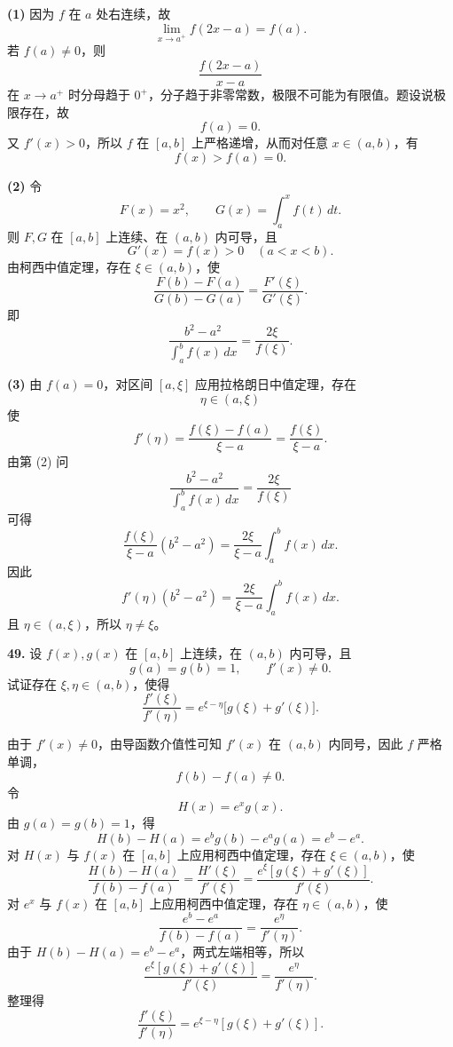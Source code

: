 \begin{solutionblock}
\textbf{(1)} 因为 \(f\) 在 \(a\) 处右连续，故
\[
\lim_{x\to a^+}f(2x-a)=f(a).
\]
若 \(f(a)\ne0\)，则
\[
\frac{f(2x-a)}{x-a}
\]
在 \(x\to a^+\) 时分母趋于 \(0^+\)，分子趋于非零常数，极限不可能为有限值。题设说极限存在，故
\[
f(a)=0.
\]
又 \(f'(x)>0\)，所以 \(f\) 在 \([a,b]\) 上严格递增，从而对任意 \(x\in(a,b)\)，有
\[
f(x)>f(a)=0.
\]

\textbf{(2)} 令
\[
F(x)=x^2,\qquad G(x)=\int_a^x f(t)\,dt.
\]
则 \(F,G\) 在 \([a,b]\) 上连续、在 \((a,b)\) 内可导，且
\[
G'(x)=f(x)>0\quad(a<x<b).
\]
由柯西中值定理，存在 \(\xi\in(a,b)\)，使
\[
\frac{F(b)-F(a)}{G(b)-G(a)}=\frac{F'(\xi)}{G'(\xi)}.
\]
即
\[
\frac{b^2-a^2}{\int_a^b f(x)\,dx}
=\frac{2\xi}{f(\xi)}.
\]

\textbf{(3)} 由 \(f(a)=0\)，对区间 \([a,\xi]\) 应用拉格朗日中值定理，存在
\[
\eta\in(a,\xi)
\]
使
\[
f'(\eta)=\frac{f(\xi)-f(a)}{\xi-a}=\frac{f(\xi)}{\xi-a}.
\]
由第 (2) 问
\[
\frac{b^2-a^2}{\int_a^b f(x)\,dx}=\frac{2\xi}{f(\xi)}
\]
可得
\[
\frac{f(\xi)}{\xi-a}(b^2-a^2)
=\frac{2\xi}{\xi-a}\int_a^b f(x)\,dx.
\]
因此
\[
f'(\eta)(b^2-a^2)=\frac{2\xi}{\xi-a}\int_a^b f(x)\,dx.
\]
且 \(\eta\in(a,\xi)\)，所以 \(\eta\ne\xi\)。
\end{solutionblock}

\begin{problemblock}
\textbf{49.} 设 \(f(x),g(x)\) 在 \([a,b]\) 上连续，在 \((a,b)\) 内可导，且
\[
g(a)=g(b)=1,\qquad f'(x)\ne0.
\]
试证存在 \(\xi,\eta\in(a,b)\)，使得
\[
\frac{f'(\xi)}{f'(\eta)}
=e^{\xi-\eta}\bigl[g(\xi)+g'(\xi)\bigr].
\]
\end{problemblock}

\begin{solutionblock}
由于 \(f'(x)\ne0\)，由导函数介值性可知 \(f'(x)\) 在 \((a,b)\) 内同号，因此 \(f\) 严格单调，
\[
f(b)-f(a)\ne0.
\]
令
\[
H(x)=e^xg(x).
\]
由 \(g(a)=g(b)=1\)，得
\[
H(b)-H(a)=e^bg(b)-e^ag(a)=e^b-e^a.
\]
对 \(H(x)\) 与 \(f(x)\) 在 \([a,b]\) 上应用柯西中值定理，存在 \(\xi\in(a,b)\)，使
\[
\frac{H(b)-H(a)}{f(b)-f(a)}
=\frac{H'(\xi)}{f'(\xi)}
=\frac{e^\xi[g(\xi)+g'(\xi)]}{f'(\xi)}.
\]
对 \(e^x\) 与 \(f(x)\) 在 \([a,b]\) 上应用柯西中值定理，存在 \(\eta\in(a,b)\)，使
\[
\frac{e^b-e^a}{f(b)-f(a)}
=\frac{e^\eta}{f'(\eta)}.
\]
由于 \(H(b)-H(a)=e^b-e^a\)，两式左端相等，所以
\[
\frac{e^\xi[g(\xi)+g'(\xi)]}{f'(\xi)}
=\frac{e^\eta}{f'(\eta)}.
\]
整理得
\[
\frac{f'(\xi)}{f'(\eta)}
=e^{\xi-\eta}[g(\xi)+g'(\xi)].
\]
\end{solutionblock}

